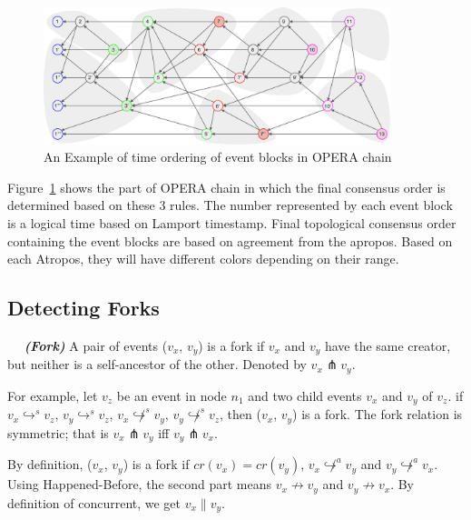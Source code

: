 \documentclass{article}
\newcommand{\dfnn}[2]{$\quad$ \textbf{\emph{(#1)}} {#2}}
\newcommand{\eself}{\hookrightarrow^{s}}
\newcommand{\eancestor}{\hookrightarrow^{a}}
\newcommand{\efork}{\pitchfork}
\newcommand{\concur}{\parallel}
\begin{document}
\newpage

\begin{figure}[H] \centering  
	\includegraphics[width=0.9\textwidth]{topological_ordering.pdf}
	\caption{An Example of time ordering of event blocks in OPERA chain}
	\label{fig:sequence of operachain}
\end{figure}


Figure~\ref{fig:sequence of operachain} shows the part of OPERA chain in which the final consensus order is determined based on these 3 rules. The number represented by each event block is a logical time based on Lamport timestamp. Final topological consensus order containing the event blocks are based on agreement from the apropos. Based on each Atropos, they will have different colors depending on their range.


\subsection{Detecting Forks}

\dfnn{Fork}{A pair of events ($v_x$, $v_y$) is a fork if $v_x$ and $v_y$ have the same creator, but neither is a self-ancestor of the other. Denoted by $v_x \efork v_y$.}

For example, let $v_z$ be an event in node $n_1$ and two child events $v_x$ and $v_y$ of $v_z$. if $v_x \eself v_z$, $v_y \eself v_z$, $v_x \not \eself v_y$, $v_y \not \eself v_z$, then ($v_x$, $v_y$) is a fork.
The fork relation is symmetric; that is $v_x \efork v_y$ iff $v_y \efork v_x$.

By definition, ($v_x$, $v_y$) is a fork if $cr(v_x)=cr(v_y)$, $v_x \not \eancestor v_y$ and $v_y \not \eancestor v_x$. Using Happened-Before, the second part means $v_x \not \rightarrow v_y$ and $v_y \not \rightarrow v_x$. By definition of concurrent, we get $v_x \concur v_y$.
\end{document}
